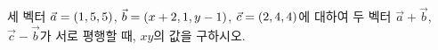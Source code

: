 세 벡터 $\vec{a}=(1{,}\mkern3mu\mathopen{}5{,}\mkern3mu\mathopen{}5)$, $\vec{b}=(x+2{,}\mkern3mu\mathopen{}1{,}\mkern3mu\mathopen{}y-1)$, $\vec{c}=(2{,}\mkern3mu\mathopen{}4{,}\mkern3mu\mathopen{}4)$에 대하여 두 벡터 $\vec{a}+\vec{b}$, $\vec{c}-\vec{b}$가 서로 평행할 때, $xy$의 값을 구하시오.
